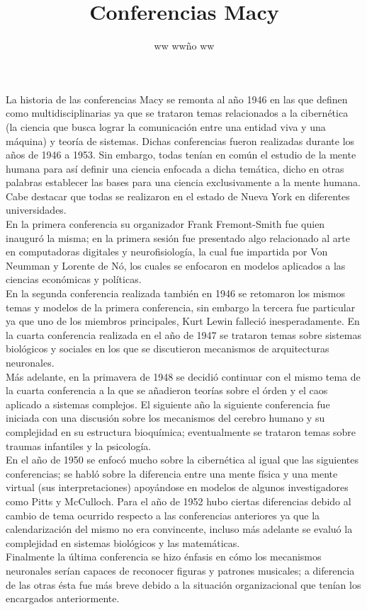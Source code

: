 \documentclass{article}
\title{Conferencias Macy}
\author{ww ww\~no ww}
\date{} %
\begin{document}
	\maketitle
	\normalsize{
La historia de las conferencias Macy se remonta al año 1946 en las que definen como multidisciplinarias ya que se trataron temas relacionados a la cibernética (la ciencia que busca lograr la comunicación entre una entidad viva y una máquina) y teoría de sistemas. Dichas conferencias fueron realizadas durante los años de 1946 a 1953. Sin embargo, todas tenían en común el estudio de la mente humana para así definir una ciencia enfocada a dicha temática, dicho en otras palabras establecer las bases para una ciencia exclusivamente a la mente humana. Cabe destacar que todas se realizaron en el estado de Nueva York en diferentes universidades.
\\

En la primera conferencia su organizador Frank Fremont-Smith fue quien inauguró la misma; en la primera sesión fue presentado algo relacionado al arte en computadoras digitales y neurofisiología, la cual fue impartida por Von Neumman y Lorente de Nó, los cuales se enfocaron en modelos aplicados a las ciencias económicas y políticas.
\\

En la segunda conferencia realizada también en 1946 se retomaron los mismos temas y modelos de la primera conferencia, sin embargo la tercera fue particular ya que uno de los miembros principales, Kurt Lewin falleció inesperadamente. En la cuarta conferencia realizada en el año de 1947 se trataron temas sobre sistemas biológicos y sociales en los que se discutieron mecanismos de arquitecturas neuronales.
\\

Más adelante, en la primavera de 1948 se decidió continuar con el mismo tema de la cuarta conferencia a la que se añadieron teorías sobre el órden y el caos aplicado a sistemas complejos. El siguiente año la siguiente conferencia fue iniciada con una discusión sobre los mecanismos del cerebro humano y su complejidad en su estructura bioquímica; eventualmente se trataron temas sobre traumas infantiles y la psicología.
\\

En el año de 1950 se enfocó mucho sobre la cibernética al igual que las siguientes conferencias; se habló sobre la diferencia entre una mente física y una mente virtual (sus interpretaciones) apoyándose en modelos de algunos investigadores como Pitts y McCulloch. Para el año de 1952 hubo ciertas diferencias debido al cambio de tema ocurrido respecto a las conferencias anteriores ya que la calendarización del mismo no era convincente, incluso más adelante se evaluó la complejidad en sistemas biológicos y las matemáticas.
\\

Finalmente la última conferencia se hizo énfasis en cómo los mecanismos neuronales serían capaces de reconocer figuras y patrones musicales; a diferencia de las otras ésta fue más breve debido a la situación organizacional que tenían los encargados anteriormente.

}
\end{document}
